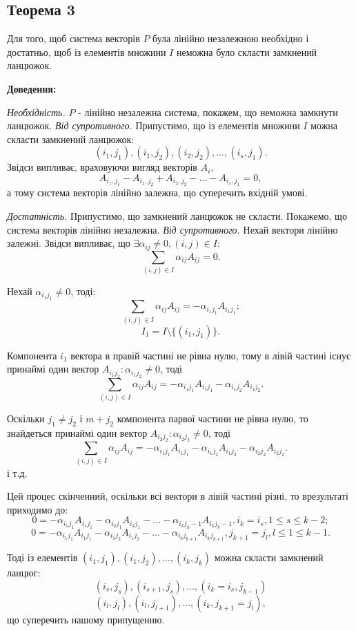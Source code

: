 \documentclass[12pt,a4paper]{book}
\begin{document}
\subsection{Теорема 3}

Для того, щоб система векторів $P$ була лінійно незалежною необхідно і достатньо, щоб із елементів множини $I$ неможна було скласти замкнений ланцюжок.

{\bf Доведення:}

{\it Необхідність.} $P$ - лінійно незалежна система, покажем, що неможна замкнути ланцюжок. {\it Від супротивного.} Припустимо, що із елементів множини $I$ можна скласти замкнений ланцюжок: $$(i_1,j_1), (i_1,j_2), (i_2,j_2), \dots, (i_s,j_1).$$ Звідси випливає, враховуючи вигляд векторів $A_i$, $$A_{{i_1},{j_1}}-A_{{i_1},{j_2}}+A_{{i_2},{j_2}}-\dots-A_{{i_s},{j_1}}=0,$$ а тому система векторів лінійно залежна, що суперечить вхідній умові.

{\it Достатність.} Припустимо, що замкнений ланцюжок не скласти. Покажемо, що система векторів лінійно незалежна. {\it Від супротивного.} Нехай вектори лінійно залежні. Звідси випливає, що $\exists \alpha_{ij} \neq 0, (i,j) \in I:$ $$\sum_{(i,j) \in I}\alpha_{ij}A_{ij} = 0.$$

Нехай $\alpha_{{i_1}{j_1}} \neq 0$, тоді: 
$$\sum_{(i,j) \in I}\alpha_{ij}A_{ij} = -\alpha_{{i_1}{j_1}}A_{{i_1}{j_1}};$$
$$I_1 = I\setminus\{(i_1,j_1)\}.$$

Компонента $i_1$ вектора в правій частині не рівна нулю, тому в лівій частині існує принаймі один вектор $A_{{i_1}{j_2}}: \alpha_{{i_1}{j_2}}\neq0$, тоді 
$$\sum_{(i,j){\in}I}\alpha_{ij}A_{ij} = -\alpha_{{i_1}{j_1}}A_{{i_1}{j_1}}-\alpha_{{i_1}{j_2}}A_{{i_1}{j_2}}.$$

Оскільки $j_1 \neq j_2$ і $m + j_2$ компонента парвої частини не рівна нулю, то знайдеться принаймі один вектор $A_{{i_2}{j_2}}: \alpha_{{i_2}{j_2}} \neq 0$, тоді $$\sum_{(i,j) \in I}\alpha_{ij}A_{ij} = -\alpha_{{i_1}{j_1}}A_{{i_1}{j_1}}-\alpha_{{i_1}{j_2}}A_{{i_1}{j_2}}-\alpha_{{i_2}{j_2}}A_{{i_2}{j_2}}.$$
і т.д.

Цей процес скінченний, оскільки всі вектори в лівій частині різні, то врезультаті приходимо до:
$$0 = -\alpha_{{i_1}{j_1}}A_{{i_1}{j_1}}-\alpha_{{i_2}{j_1}}A_{{i_2}{j_1}}-\dots-\alpha_{{i_k}{j_k-1}}A_{{i_k}{j_k-1}}, i_k=i_s, 1 \le s \le k-2;$$
$$0 = -\alpha_{{i_1}{j_1}}A_{{i_1}{j_1}}-\alpha_{{i_1}{j_2}}A_{{i_1}{j_2}}-\dots-\alpha_{{i_k}{j_{k+1}}}A_{{i_k}{j_{k+1}}}, j_{k+1}=j_l, l \le 1 \le k-1.$$

Тоді із елементів $(i_1,j_1), (i_1,j_2), \dots, (i_k,j_k)$ можна скласти замкнений ланцюг:
$$(i_s,j_s), (i_{s+1},j_s), \dots, (i_k = i_s, j_{k-1})$$
$$(i_l,j_l), (i_l,j_{l+1}), \dots, (i_k, j_{k+1} = j_l),$$
що суперечить нашому припущенню.
\end{document}
